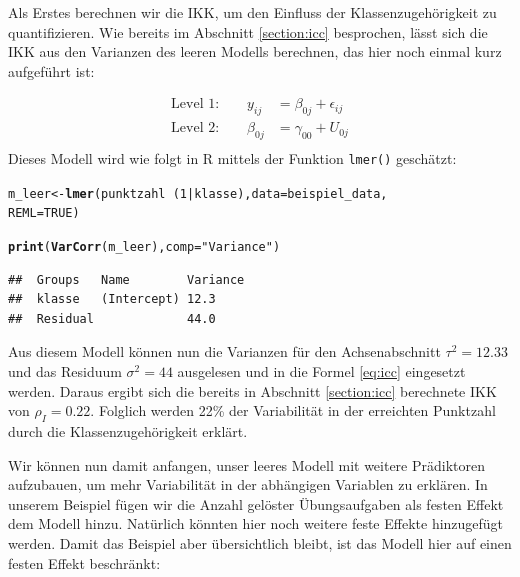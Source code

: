 \documentclass[12pt, a4paper]{article}\usepackage[]{graphicx}\usepackage[]{color}
\makeatletter
\newcommand{\hlnum}[1]{\textcolor[rgb]{0.686,0.059,0.569}{#1}}%
\newcommand{\hlstr}[1]{\textcolor[rgb]{0.192,0.494,0.8}{#1}}%
\newcommand{\hlopt}[1]{\textcolor[rgb]{0,0,0}{#1}}%
\newcommand{\hlstd}[1]{\textcolor[rgb]{0.345,0.345,0.345}{#1}}%
\newcommand{\hlkwb}[1]{\textcolor[rgb]{0.69,0.353,0.396}{#1}}%
\newcommand{\hlkwc}[1]{\textcolor[rgb]{0.333,0.667,0.333}{#1}}%
\newcommand{\hlkwd}[1]{\textcolor[rgb]{0.737,0.353,0.396}{\textbf{#1}}}%
\newenvironment{kframe}{%
 \def\at@end@of@kframe{}%
 \ifinner\ifhmode%
  \def\at@end@of@kframe{\end{minipage}}%
  \begin{minipage}{\columnwidth}%
 \fi\fi%
 \def\FrameCommand##1{\hskip\@totalleftmargin \hskip-\fboxsep
 \colorbox{shadecolor}{##1}\hskip-\fboxsep
     \hskip-\linewidth \hskip-\@totalleftmargin \hskip\columnwidth}%
 \MakeFramed {\advance\hsize-\width
   \@totalleftmargin\z@ \linewidth\hsize
   \@setminipage}}%
 {\par\unskip\endMakeFramed%
 \at@end@of@kframe}
\newenvironment{knitrout}{}{} %
\makeatother
\begin{document}
Als Erstes berechnen wir die IKK, um den Einfluss der Klassenzugehörigkeit zu quantifizieren. Wie bereits im Abschnitt \ref{section:icc} besprochen, lässt sich die IKK aus den Varianzen des leeren Modells berechnen, das hier noch einmal kurz aufgeführt ist:

\begin{equation}
\begin{split}	
 \text{Level 1:}  \qquad y_{ij} & = \beta_{0j} + \epsilon_{ij}\\
 \text{Level 2:} \qquad \beta_{0j} & = \gamma_{00} + U_{0j}\\
\end{split}	
\end{equation} 
Dieses Modell wird wie folgt in R mittels der Funktion \texttt{lmer()} geschätzt:

\singlespacing
\begin{knitrout}
\color{fgcolor}\begin{kframe}
\begin{alltt}
\hlstd{m_leer} \hlkwb{<-} \hlkwd{lmer}\hlstd{(punktzahl} \hlopt{~} \hlstd{(}\hlnum{1} \hlopt{|} \hlstd{klasse),} \hlkwc{data} \hlstd{= beispiel_data,}
    \hlkwc{REML} \hlstd{=} \hlnum{TRUE}\hlstd{)}

\hlkwd{print}\hlstd{(}\hlkwd{VarCorr}\hlstd{(m_leer),} \hlkwc{comp} \hlstd{=} \hlstr{"Variance"}\hlstd{)}
\end{alltt}
\begin{verbatim}
##  Groups   Name        Variance
##  klasse   (Intercept) 12.3    
##  Residual             44.0
\end{verbatim}
\end{kframe}
\end{knitrout}

Aus diesem Modell können nun die Varianzen für den Achsenabschnitt $\tau^2 = 12.33$ und das Residuum $\sigma^2 = 44$ ausgelesen und in die Formel \eqref{eq:icc} eingesetzt werden. Daraus ergibt sich die bereits in Abschnitt \ref{section:icc} berechnete IKK von $\rho_I = 0.22$. Folglich werden 22\% der Variabilität in der erreichten Punktzahl durch die Klassenzugehörigkeit erklärt.

Wir können nun damit anfangen, unser leeres Modell mit weitere Prädiktoren aufzubauen, um mehr Variabilität in der abhängigen Variablen zu erklären. In unserem Beispiel fügen wir die Anzahl gelöster Übungsaufgaben als festen Effekt dem Modell hinzu. Natürlich könnten hier noch weitere feste Effekte hinzugefügt werden. Damit das Beispiel aber übersichtlich bleibt, ist das Modell hier auf einen festen Effekt beschränkt:
\end{document}
